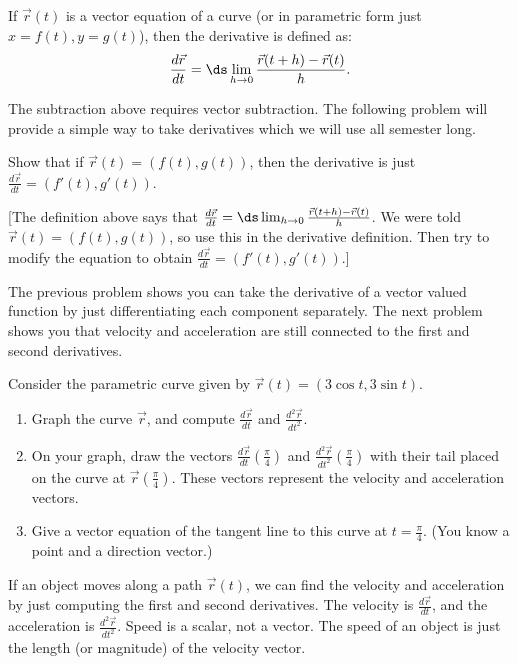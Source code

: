 \begin{definition}
If $\vec r(t)$ is a vector equation of a curve (or in parametric form just $x=f(t), y=g(t)$), then the derivative is defined as: $$\frac{d\vec r}{dt}=\ds\lim_{h\to 0}\frac{\vec r(t+h)-\vec r(t)}{h}.$$
\end{definition}
The subtraction above requires vector subtraction.  The following problem will provide a simple way to take derivatives which we will use all semester long.

\begin{problem} 
%
Show that if $\vec r(t) = (f(t),g(t))$, then the derivative is just $\frac{d\vec r}{dt} = (f'(t),g'(t))$.  

[The definition above says that $\frac{d\vec r}{dt}=\ds\lim_{h\to 0}\frac{\vec r(t+h)-\vec r(t)}{h}$. We were told $\vec r(t) = (f(t),g(t))$, so use this in the derivative definition.  Then try to modify the equation to obtain $\frac{d\vec r}{dt} = (f'(t),g'(t))$.]
\end{problem}
The previous problem shows you can take the derivative of a vector valued function by just differentiating each component separately. The next problem shows you that velocity and acceleration are still connected to the first and second derivatives. 

\begin{problem}  
%
Consider the parametric curve given by $\vec r(t)=( 3\cos t, 3\sin t )$. 
\begin{enumerate}
\item Graph the curve $\vec r$, and compute $\frac{d\vec r}{dt}$ and $\frac{d^2\vec r}{dt^2}$. 
\item On your graph, draw the vectors $\frac{d\vec r}{dt}\left(\frac{\pi}{4}\right)$ and $\frac{d^2\vec r}{dt^2}\left(\frac{\pi}{4}\right)$ with their tail placed on the curve at $\vec r\left(\frac{\pi}{4}\right)$. These vectors represent the velocity and acceleration vectors.
\item Give a vector equation of the tangent line to this curve at $t=\frac{\pi}{4}$. (You know a point and a direction vector.)
\end{enumerate}
\end{problem}

\begin{definition}\label{def:velocity acceleration}
If an object moves along a path $\vec r(t)$, we can find the velocity and acceleration by just computing the first and second derivatives. The velocity is $\frac{d\vec r}{dt}$, and the acceleration is $\frac{d^2\vec r}{dt^2}$. Speed is a scalar, not a vector. The speed of an object is just the length (or magnitude) of the velocity vector.
\end{definition}

